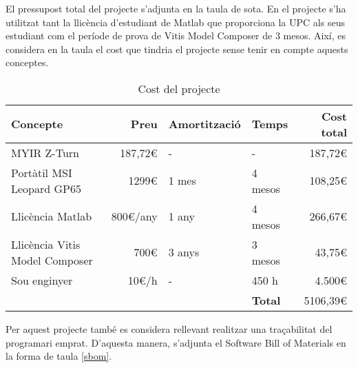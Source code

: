 El pressupost total del projecte s'adjunta en la taula de sota. En el projecte
s'ha utilitzat tant la llicència d'estudiant de Matlab que proporciona la UPC
als seus estudiant com el període de prova de Vitis Model Composer de 3 mesos.
Així, es considera en la taula el cost que tindria el projecte sense tenir en
compte aquests conceptes.

\begin{table}[!htb]
    \caption{Cost del projecte}

    \begin{tabular}{l r l l r}
        \toprule
            \textbf{Concepte} & 
            \textbf{Preu} & 
            \textbf{Amortització} & 
            \textbf{Temps} & 
            \textbf{Cost total} \\
        \midrule
        
            MYIR Z-Turn & 
            187,72€ & 
            - & 
            - &
            187,72€ \\

            Portàtil MSI Leopard GP65 & 
            1299€ &
            1 mes &
            4 mesos &
            108,25€ \\

            Llicència Matlab & 
            800€/any &
            1 any &
            4 mesos &
            266,67€ \\

            Llicència Vitis Model Composer & 
            700€ &
            3 anys &
            3 mesos &
            43,75€ \\

            Sou enginyer & 
            10€/h &
            - &
            450 h &
            4.500€ \\
        \midrule
            {} & {} & {} & {\textbf{Total}} & {5106,39€} \\
        \cline{4-5}
    \end{tabular}
\end{table}

Per aquest projecte també es considera rellevant realitzar una traçabilitat
del programari emprat. D'aquesta manera, s'adjunta el Software Bill of
Materials en la forma de taula \ref{sbom}.

